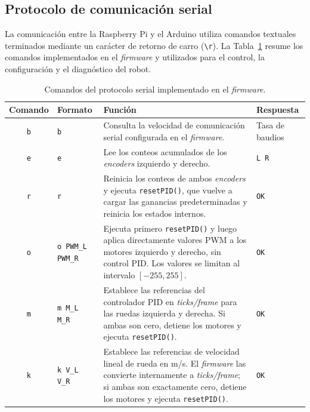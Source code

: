 \begin{appendices}
\subsection{Protocolo de comunicación serial}
\label{anx:protocolo_serial}

La comunicación entre la Raspberry Pi y el \gls{Arduino} utiliza comandos textuales terminados mediante un carácter de retorno de carro (\texttt{\textbackslash r}). La Tabla~\ref{tab:protocolo_serial} resume los comandos implementados en el \textit{firmware} y utilizados para el control, la configuración y el diagnóstico del robot.

\begin{table}[H]
\centering
\caption{Comandos del protocolo serial implementado en el \textit{firmware}.}
\label{tab:protocolo_serial}
\small
\begin{tabular}{c p{2.7cm} p{6.8cm} p{2.2cm}}
\toprule
\textbf{Comando} &
\textbf{Formato} &
\textbf{Función} &
\textbf{Respuesta} \\
\midrule

\texttt{b} &
\texttt{b} &
Consulta la velocidad de comunicación serial configurada en el \textit{firmware}. &
Tasa de baudios \\

\texttt{e} &
\texttt{e} &
Lee los conteos acumulados de los \textit{encoders} izquierdo y derecho. &
\texttt{L R} \\

\texttt{r} &
\texttt{r} &
Reinicia los conteos de ambos \textit{encoders} y ejecuta \texttt{resetPID()}, que vuelve a cargar las ganancias predeterminadas y reinicia los estados internos. &
\texttt{OK} \\

\texttt{o} &
\texttt{o PWM\_L PWM\_R} &
Ejecuta primero \texttt{resetPID()} y luego aplica directamente valores PWM a los motores izquierdo y derecho, sin control PID. Los valores se limitan al intervalo $[-255,255]$. &
\texttt{OK} \\

\texttt{m} &
\texttt{m M\_L M\_R} &
Establece las referencias del controlador PID en \textit{ticks/frame} para las ruedas izquierda y derecha. Si ambas son cero, detiene los motores y ejecuta \texttt{resetPID()}. &
\texttt{OK} \\

\texttt{k} &
\texttt{k V\_L V\_R} &
Establece las referencias de velocidad lineal de rueda en m/s. El \textit{firmware} las convierte internamente a \textit{ticks/frame}; si ambas son exactamente cero, detiene los motores y ejecuta \texttt{resetPID()}. &
\texttt{OK} \\


\end{tabular}
\end{table}
\end{appendices}
